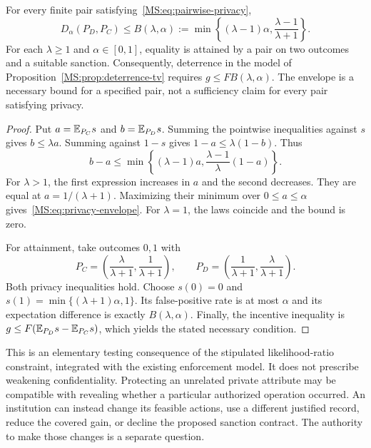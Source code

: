 \begin{MStheorem}\label{MS:thm:privacy-envelope}
For every finite pair satisfying~\eqref{MS:eq:pairwise-privacy},
\begin{equation}\label{MS:eq:privacy-envelope}
D_\alpha(P_D,P_C)\le
 B(\lambda,\alpha):=
 \min\left\{(\lambda-1)\alpha,\frac{\lambda-1}{\lambda+1}\right\}.
\end{equation}
For each $\lambda\ge1$ and $\alpha\in[0,1]$, equality is attained by a pair on two outcomes and a suitable sanction. Consequently, deterrence in the model of Proposition~\ref{MS:prop:deterrence-tv} requires $g\le F B(\lambda,\alpha)$. The envelope is a necessary bound for a specified pair, not a sufficiency claim for every pair satisfying privacy.
\end{MStheorem}
\begin{proof}
Put $a=\mathbb E_{P_C}s$ and $b=\mathbb E_{P_D}s$. Summing the pointwise inequalities against $s$ gives $b\le\lambda a$. Summing against $1-s$ gives $1-a\le\lambda(1-b)$. Thus
\[
b-a\le\min\left\{(\lambda-1)a,
                   \frac{\lambda-1}{\lambda}(1-a)\right\}.
\]
For $\lambda>1$, the first expression increases in $a$ and the second decreases. They are equal at $a=1/(\lambda+1)$. Maximizing their minimum over $0\le a\le\alpha$ gives~\eqref{MS:eq:privacy-envelope}. For $\lambda=1$, the laws coincide and the bound is zero.

For attainment, take outcomes $0,1$ with
\[
P_C=\left(\frac{\lambda}{\lambda+1},\frac1{\lambda+1}\right),
\qquad
P_D=\left(\frac1{\lambda+1},\frac{\lambda}{\lambda+1}\right).
\]
Both privacy inequalities hold. Choose $s(0)=0$ and
$s(1)=\min\{(\lambda+1)\alpha,1\}$. Its false-positive rate is at most $\alpha$ and its expectation difference is exactly $B(\lambda,\alpha)$. Finally, the incentive inequality is $g\le F(\mathbb E_{P_D}s-\mathbb E_{P_C}s)$, which yields the stated necessary condition.
\end{proof}

This is an elementary testing consequence of the stipulated likelihood-ratio constraint, integrated with the existing enforcement model. It does not prescribe weakening confidentiality. Protecting an unrelated private attribute may be compatible with revealing whether a particular authorized operation occurred. An institution can instead change its feasible actions, use a different justified record, reduce the covered gain, or decline the proposed sanction contract. The authority to make those changes is a separate question.

